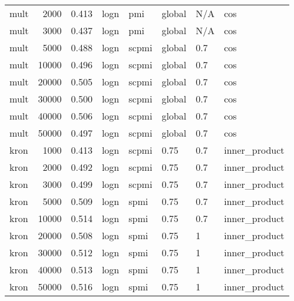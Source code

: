 \begin{tabular}{lrrlllll}
    mult &            2000 &  0.413 &  logn &    pmi &  global &  N/A &            cos \\
    mult &            3000 &  0.437 &  logn &    pmi &  global &  N/A &            cos \\
    mult &            5000 &  0.488 &  logn &  scpmi &  global &  0.7 &            cos \\
    mult &           10000 &  0.496 &  logn &  scpmi &  global &  0.7 &            cos \\
    mult &           20000 &  0.505 &  logn &  scpmi &  global &  0.7 &            cos \\
    mult &           30000 &  0.500 &  logn &  scpmi &  global &  0.7 &            cos \\
    mult &           40000 &  0.506 &  logn &  scpmi &  global &  0.7 &            cos \\
    mult &           50000 &  0.497 &  logn &  scpmi &  global &  0.7 &            cos \\
    kron &            1000 &  0.413 &  logn &  scpmi &    0.75 &  0.7 &  inner\_product \\
    kron &            2000 &  0.492 &  logn &  scpmi &    0.75 &  0.7 &  inner\_product \\
    kron &            3000 &  0.499 &  logn &  scpmi &    0.75 &  0.7 &  inner\_product \\
    kron &            5000 &  0.509 &  logn &   spmi &    0.75 &  0.7 &  inner\_product \\
    kron &           10000 &  0.514 &  logn &   spmi &    0.75 &  0.7 &  inner\_product \\
    kron &           20000 &  0.508 &  logn &   spmi &    0.75 &    1 &  inner\_product \\
    kron &           30000 &  0.512 &  logn &   spmi &    0.75 &    1 &  inner\_product \\
    kron &           40000 &  0.513 &  logn &   spmi &    0.75 &    1 &  inner\_product \\
    kron &           50000 &  0.516 &  logn &   spmi &    0.75 &    1 &  inner\_product \\
\bottomrule
\end{tabular}
